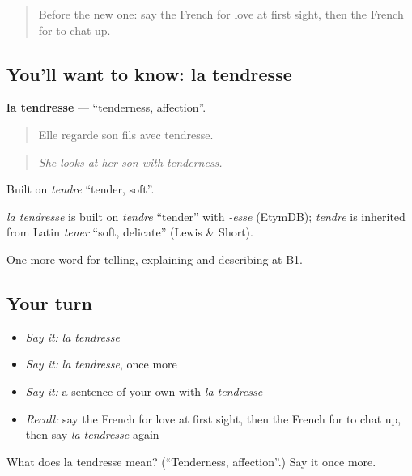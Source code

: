\begin{quote}
Before the new one: say the French for love at first sight, then the French for to chat up.
\end{quote}

\subsection*{You'll want to know: la tendresse}
\textbf{la tendresse} — \textquotedblleft{}tenderness, affection\textquotedblright{}.

\begin{quote}
Elle regarde son fils avec tendresse.
\end{quote}

\begin{quote}
\emph{She looks at her son with tenderness.}
\end{quote}

Built on \emph{tendre} \textquotedblleft{}tender, soft\textquotedblright{}.

\begin{cousinweb}
\emph{la tendresse} is built on \emph{tendre} \textquotedblleft{}tender\textquotedblright{} with \emph{-esse} (EtymDB); \emph{tendre} is inherited from Latin \emph{tener} \textquotedblleft{}soft, delicate\textquotedblright{} (Lewis \& Short).
\end{cousinweb}

\begin{grammarlens}[title={What you've built}]
One more word for telling, explaining and describing at B1.
\end{grammarlens}

\subsection*{Your turn}
\begin{itemize}
\raggedright
  \item \emph{Say it:} \emph{la tendresse}
  \item \emph{Say it:} \emph{la tendresse}, once more
  \item \emph{Say it:} a sentence of your own with \emph{la tendresse}
  \item \emph{Recall:} say the French for love at first sight, then the French for to chat up, then say \emph{la tendresse} again
\end{itemize}

\begin{tcolorbox}[breakable,colback=teal!4,colframe=teal!35!black,title={Before you move on}]
What does la tendresse mean? (\textquotedblleft{}Tenderness, affection\textquotedblright{}.) Say it once more.
\end{tcolorbox}
